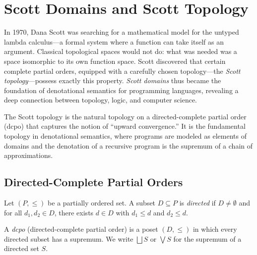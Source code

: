 \chapter{Scott Domains and Scott Topology}
\label{ch:scott}

In 1970, Dana Scott was searching for a mathematical model for the untyped lambda calculus---a formal system where a function can take itself as an argument. Classical topological spaces would not do: what was needed was a space isomorphic to its own function space. Scott discovered that certain complete partial orders, equipped with a carefully chosen topology---the \emph{Scott topology}---possess exactly this property. \emph{Scott domains} thus became the foundation of denotational semantics for programming languages, revealing a deep connection between topology, logic, and computer science.

\begin{intuition}
The Scott topology is the natural topology on a directed-complete partial order (dcpo) that
captures the notion of ``upward convergence.'' It is the fundamental topology in
denotational semantics, where programs are modeled as elements of domains and the
denotation of a recursive program is the supremum of a chain of approximations.
\end{intuition}

\section{Directed-Complete Partial Orders}

\begin{definition}
Let $(P,\leq)$ be a partially ordered set. A subset $D \subseteq P$ is \emph{directed}
if $D \neq \emptyset$ and for all $d_1, d_2 \in D$, there exists $d \in D$ with
$d_1 \leq d$ and $d_2 \leq d$.
\end{definition}

\begin{definition}[Dcpo]
A \emph{dcpo} (directed-complete partial order) is a poset $(D,\leq)$ in which every
directed subset has a supremum. We write $\bigsqcup S$ or $\bigvee S$ for the supremum of
a directed set $S$.
\end{definition}

